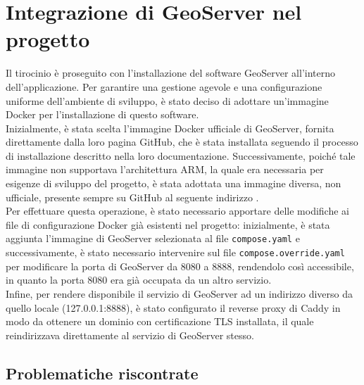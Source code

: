 \section{Integrazione di GeoServer nel progetto}

Il tirocinio è proseguito con l'installazione del software GeoServer all'interno dell'applicazione. Per garantire una gestione agevole e una configurazione uniforme dell'ambiente di sviluppo, è stato deciso di adottare un'immagine Docker per l'installazione di questo software.
\\Inizialmente, è stata scelta l'immagine Docker ufficiale di GeoServer, fornita direttamente dalla loro pagina GitHub, che è stata installata seguendo il processo di installazione descritto nella loro documentazione.  
Successivamente, poiché tale immagine non supportava l'architettura ARM, la quale era necessaria per esigenze di sviluppo del progetto, è stata adottata una immagine diversa, non ufficiale, presente sempre su GitHub al seguente indirizzo \cite{ImmagineGithubGeoServer}.
\\Per effettuare questa operazione, è stato necessario apportare delle modifiche ai file di configurazione Docker già esistenti nel progetto: inizialmente, è stata aggiunta l'immagine di GeoServer selezionata al file  \verb|compose.yaml| e successivamente, è stato necessario intervenire sul file \verb|compose.override.yaml| per modificare la porta di GeoServer da 8080 a 8888, rendendolo così accessibile, in quanto la porta 8080 era già occupata da un altro servizio.
\\Infine, per rendere disponibile il servizio di GeoServer ad un indirizzo diverso da quello locale (127.0.0.1:8888), è stato configurato il reverse proxy di Caddy in modo da ottenere un dominio con certificazione TLS installata, il quale reindirizzava  direttamente al servizio di GeoServer stesso. 

\subsection{Problematiche riscontrate}

